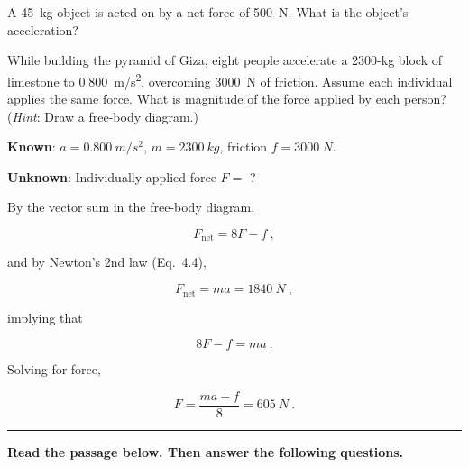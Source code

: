 \documentclass{exam}
\begin{document}
\begin{questions}
\question
A \SI{45}{kg} object is acted on by a net force of \SI{500}{N}. What is the object's acceleration?

\question
While building the pyramid of Giza, eight people accelerate a 2300-kg block of limestone to \SI{0.800}{m/s^2}, overcoming \SI{3000}{N} of friction. Assume each individual applies the same force. What is magnitude of the force applied by each person? (\textit{Hint}: Draw a free-body diagram.)

\begin{solution}
\vspace{1em}

\textbf{Known}: $a = \SI{0.800}{m/s^2}$, $m = \SI{2300}{kg}$, friction $f = \SI{3000}{N}$. 

\textbf{Unknown}: Individually applied force $F =$ ?

\vspace{1em}

By the vector sum in the free-body diagram,

\begin{equation*}
    F_{\mathrm{net}} = 8F - f\ ,
\end{equation*}

and by Newton's 2nd law (Eq.~4.4),

\begin{equation*}
    F_{\mathrm{net}} = m a = \SI{1840}{N}\ ,
\end{equation*}

implying that

\begin{equation*}
     8F - f = ma\ .
\end{equation*}

Solving for force,

\begin{equation*}
    F = \frac{ma + f}{8} = \SI{605}{N}\ .
\end{equation*}
\end{solution}
\vspace{1em}

\hrule

\begin{EnvUplevel}
\hspace{2cm}
\begin{minipage}{0.6\textwidth}
\textbf{Read the passage below. Then answer the following questions.}\\


\end{minipage}
\end{EnvUplevel}
\end{questions}
\end{document}
